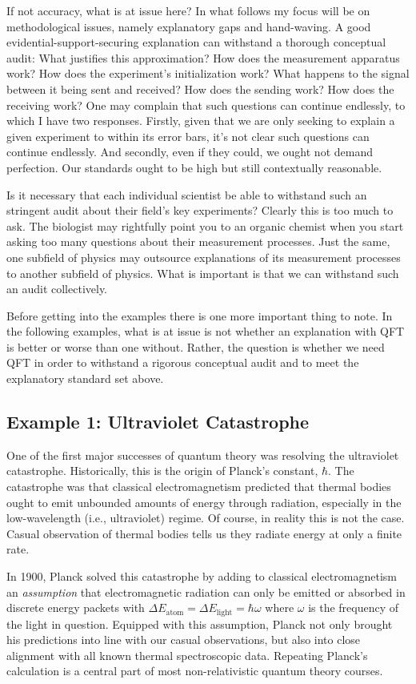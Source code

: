 \documentclass[prd,twocolumn,superscriptaddress,floatfix,amsmath,amssymb,amsfonts,nofootinbib]{revtex4-2}
\begin{document}
If not accuracy, what is at issue here? In what follows my focus will be on methodological issues, namely explanatory gaps and hand-waving. A good evidential-support-securing explanation can withstand a thorough conceptual audit: What justifies this approximation? How does the measurement apparatus work? How does the experiment's initialization work? What happens to the signal between it being sent and received? How does the sending work? How does the receiving work? One may complain that such questions can continue endlessly, to which I have two responses. Firstly, given that we are only seeking to explain a given experiment to within its error bars, it's not clear such questions can continue endlessly. And secondly, even if they could, we ought not demand perfection. Our standards ought to be high but still contextually reasonable.

Is it necessary that each individual scientist be able to withstand such an stringent audit about their field's key experiments? Clearly this is too much to ask. The biologist may rightfully point you to an organic chemist when you start asking too many questions about their measurement processes. Just the same, one subfield of physics may outsource explanations of its measurement processes to another subfield of physics. What is important is that we can withstand such an audit collectively.

Before getting into the examples there is one more important thing to note. In the following examples, what is at issue is not whether an explanation with QFT is better or worse than one without. Rather, the question is whether we need QFT in order to withstand a rigorous conceptual audit and to meet the explanatory standard set above.

\subsection{Example 1: Ultraviolet Catastrophe}
One of the first major successes of quantum theory was resolving the ultraviolet catastrophe. Historically, this is the origin of Planck's constant, $\hbar$. The catastrophe was that classical electromagnetism predicted that thermal bodies ought to emit unbounded amounts of energy through radiation, especially in the low-wavelength (i.e., ultraviolet) regime. Of course, in reality this is not the case. Casual observation of thermal bodies tells us they radiate energy at only a finite rate. 

In 1900, Planck solved this catastrophe by adding to classical electromagnetism an \textit{assumption} that electromagnetic radiation can only be emitted or absorbed in discrete energy packets with \mbox{$\Delta E_\text{atom}=\Delta E_\text{light}=\hbar\omega$} where $\omega$ is the frequency of the light in question. Equipped with this assumption, Planck not only brought his predictions into line with our casual observations, but also into close alignment with all known thermal spectroscopic data. Repeating Planck's calculation is a central part of most non-relativistic quantum theory courses.
\end{document}
